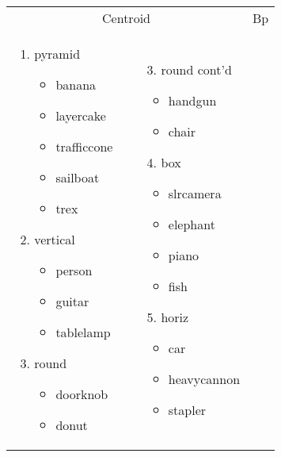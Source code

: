 \begin{figure}
  \begin{tabular}{llll}
   \multicolumn{2}{c}{Centroid} & \multicolumn{2}{c}{Bp} \\
	 \parbox[t]{1.4in}{\raggedright  	{} \small
	\begin{enumerate}
	\item pyramid
	\begin{itemize}[leftmargin=*]
	\item banana
	\item layercake
	\item trafficcone
	\item sailboat
	\item trex
	\end{itemize}
	\item vertical
	\begin{itemize}[leftmargin=*]
	\item person
	\item guitar
	\item tablelamp
	\end{itemize}
	\item round
	\begin{itemize}[leftmargin=*]
	\item doorknob
	\item donut
	\end{itemize}
	\end{enumerate}
	} & 
	 \parbox[t]{1.4in}{\raggedright 	{} \small
	\begin{enumerate}
	\item[3.] round cont'd
	\begin{itemize}[leftmargin=*]
	\item handgun
	\item chair
	\end{itemize}
	\item[4.] box
	\begin{itemize}[leftmargin=*]
	\item slrcamera
	\item elephant
	\item piano
	\item fish
	\end{itemize}
	\item[5.] horiz
	\begin{itemize}[leftmargin=*]
	\item car
	\item heavycannon
	\item stapler

\end{itemize}
\end{enumerate}}
\end{tabular}
\end{figure}
